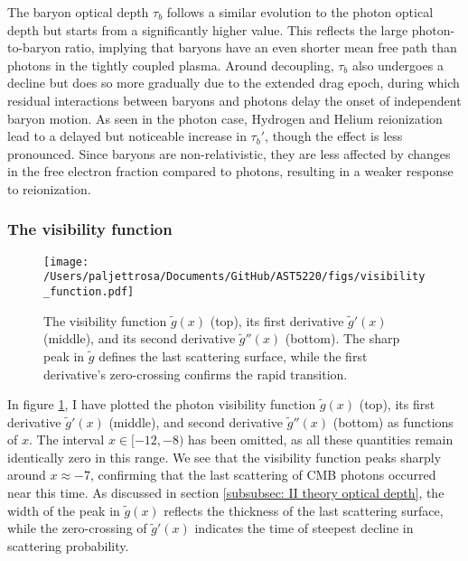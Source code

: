 \documentclass{aa}
\numberwithin{equation}{section}
\numberwithin{table}{section}
\numberwithin{figure}{section}
\begin{document}
The baryon optical depth $\tau_b$ follows a similar evolution to the photon optical depth but starts from a significantly higher value. This reflects the large photon-to-baryon ratio, implying that baryons have an even shorter mean free path than photons in the tightly coupled plasma. Around decoupling, $\tau_b$ also undergoes a decline but does so more gradually due to the extended drag epoch, during which residual interactions between baryons and photons delay the onset of independent baryon motion. As seen in the photon case, Hydrogen and Helium reionization lead to a delayed but noticeable increase in $\tau_b'$, though the effect is less pronounced. Since baryons are non-relativistic, they are less affected by changes in the free electron fraction compared to photons, resulting in a weaker response to reionization.


\subsubsection{The visibility function}

\begin{figure}
  \centering
  \texttt{[image: /Users/paljettrosa/Documents/GitHub/AST5220/figs/visibility\_function.pdf]}
  \caption{The visibility function $\tilde{g}(x)$ (top), its first derivative $\tilde{g}'(x)$ (middle), and its second derivative $\tilde{g}''(x)$ (bottom). The sharp peak in $\tilde{g}$ defines the last scattering surface, while the first derivative's zero-crossing confirms the rapid transition. 
  }\label{fig:visibility function}
\end{figure}

In figure \ref{fig:visibility function}, I have plotted the photon visibility function $\tilde{g}(x)$ (top), its first derivative $\tilde{g}'(x)$ (middle), and second derivative $\tilde{g}''(x)$ (bottom) as functions of $x$. The interval $x\in[-12,-8)$ has been omitted, as all these quantities remain identically zero in this range. We see that the visibility function peaks sharply around $x \approx -7$, confirming that the last scattering of CMB photons occurred near this time. 
As discussed in section \ref{subsubsec: II theory optical depth}, the width of the peak in $\tilde{g}(x)$ reflects the thickness of the last scattering surface, while the zero-crossing of $\tilde{g}'(x)$ indicates the time of steepest decline in scattering probability. 
\end{document}
